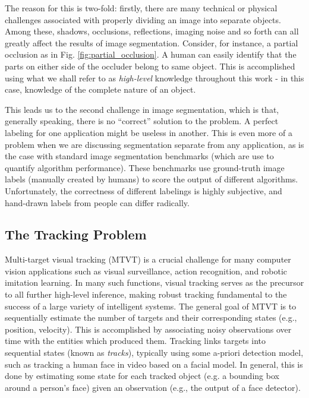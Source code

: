 The reason for this is two-fold: firstly, there are many technical or physical challenges associated with properly dividing an image into separate objects. Among these, shadows, occlusions, reflections, imaging noise and so forth can all greatly affect the results of image segmentation. Consider, for instance, a partial occlusion as in Fig. \ref{fig:partial_occlusion}. A human can easily identify that the parts on either side of the occluder belong to same object. This is accomplished using what we shall refer to as \emph{high-level} knowledge throughout this work - in this case, knowledge of the complete nature of an object. 

This leads us to the second challenge in image segmentation, which is that, generally speaking, there is no ``correct'' solution to the problem. A perfect labeling for one application might be useless in another. This is even more of a problem when we are discussing segmentation separate from any application, as is the case with standard image segmentation benchmarks (which are use to quantify algorithm performance). These benchmarks use ground-truth image labels (manually created by humans) to score the output of different algorithms. Unfortunately, the correctness of different labelings is highly subjective, and hand-drawn labels from  people can differ radically.


\subsection{The Tracking Problem}
Multi-target visual tracking (MTVT) is a crucial challenge for many computer vision applications such as visual surveillance, action recognition, and robotic imitation learning. In many such functions, visual tracking serves as the precursor to all further high-level inference, making robust tracking fundamental to the success of a large variety of intelligent systems. The general goal of MTVT is to sequentially estimate the number of targets and their corresponding states (e.g., position, velocity). This is accomplished by associating noisy observations over time with the entities which produced them. Tracking links targets into sequential states (known as \emph{tracks}), typically using some a-priori detection model, such as tracking a human face in video based on a facial model. In general, this is done by estimating some state for each tracked object (e.g. a bounding box around a person's face) given an observation (e.g., the output of a face detector).


